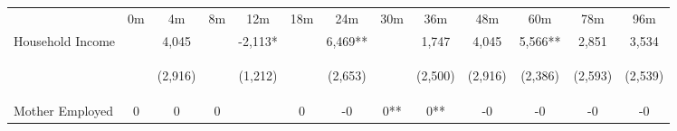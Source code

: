 \begin{tabular}{lcccccccccccc}
\hline \noalign{\smallskip} & 0m & 4m & 8m & 12m & 18m & 24m & 30m & 36m & 48m & 60m & 78m & 96m\\
\noalign{\smallskip}\hline \noalign{\smallskip}Household Income &  & 4,045 &  & -2,113* &  & 6,469** &  & 1,747 & 4,045 & 5,566** & 2,851 & 3,534\\
 & \begin{footnotesize}\end{footnotesize} & \begin{footnotesize}(2,916)\end{footnotesize} & \begin{footnotesize}\end{footnotesize} & \begin{footnotesize}(1,212)\end{footnotesize} & \begin{footnotesize}\end{footnotesize} & \begin{footnotesize}(2,653)\end{footnotesize} & \begin{footnotesize}\end{footnotesize} & \begin{footnotesize}(2,500)\end{footnotesize} & \begin{footnotesize}(2,916)\end{footnotesize} & \begin{footnotesize}(2,386)\end{footnotesize} & \begin{footnotesize}(2,593)\end{footnotesize} & \begin{footnotesize}(2,539)\end{footnotesize}\\
\noalign{\smallskip}Mother Employed & 0 & 0 & 0 &  & 0 & -0 & 0** & 0** & -0 & -0 & -0 & -0\\

\end{tabular}
